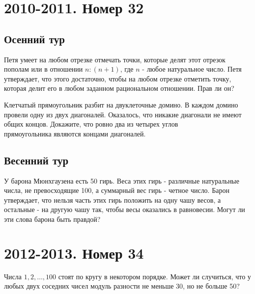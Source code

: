\documentclass[11pt, a4paper]{common/document_template}
\begin{document}
\chapter{2010-2011. Номер 32}

\section{Осенний тур}

\begin{exercise}
Петя умеет на любом отрезке отмечать точки, которые делят этот отрезок пополам или в отношении $n : (n + 1)$, где $n$ - любое натуральное число. Петя утверждает, что этого достаточно, чтобы на любом отрезке отметить точку, которая делит его в любом заданном
рациональном отношении. Прав ли он?
\end{exercise}

\begin{exercise}
Клетчатый прямоугольник разбит на двуклеточные домино. В каждом домино провели одну из двух диагоналей. Оказалось, что никакие диагонали не имеют общих концов. Докажите, что ровно два из четырех углов \\ прямоугольника являются концами диагоналей.
\end{exercise}

\section{Весенний тур}

\begin{exercise}
У барона Мюнхгаузена есть 50 гирь. Веса этих гирь - различные натуральные числа, не превосходящие 100, а суммарный вес гирь - четное число. Барон утверждает, что нельзя часть этих гирь положить на одну чашу весов, а остальные - на другую чашу так, чтобы весы оказались в равновесии. Могут ли эти слова барона быть правдой?
\end{exercise}

\chapter{2012-2013. Номер 34}

\begin{exercise}
Числа $1, 2, \dots, 100$ стоят по кругу в некотором порядке. Может ли случиться, что у любых двух соседних чисел модуль разности не меньше 30, но не больше 50?
\end{exercise}
\end{document}
